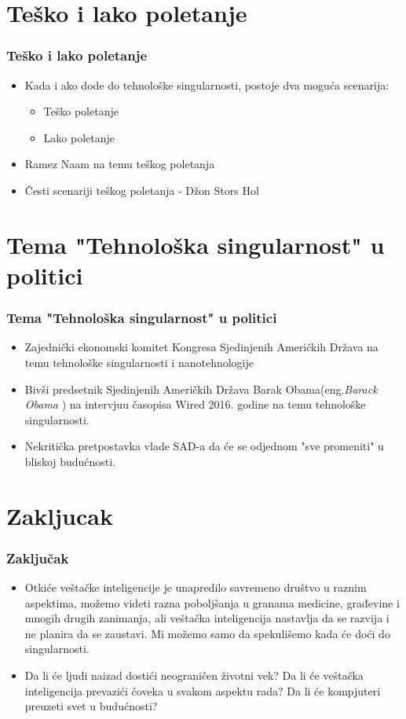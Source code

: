 \documentclass{beamer}
\begin{document}
\section{Teško i lako poletanje}

\begin{frame}[fragile]\frametitle{Teško i lako poletanje}
	\begin{itemize}	
		\item Kada i ako dode do tehnološke singularnosti, postoje dva moguća scenarija:
  \begin{itemize}
  \item Teško poletanje 
  \item  Lako poletanje
  \end{itemize}
		\item Ramez Naam na temu teškog poletanja
		\item Česti scenariji teškog poletanja - Džon Stors Hol
	\end{itemize}
\end{frame}

\section{Tema "Tehnološka singularnost" u politici}

\begin{frame}[fragile]\frametitle{Tema "Tehnološka singularnost" u politici}
	\begin{itemize}	
		\item Zajednički ekonomski komitet Kongresa Sjedinjenih Američkih Država na temu tehnološke singularnosti  i nanotehnologije
		\item Bivši predsetnik Sjedinjenih Američkih Država Barak Obama(eng.\textit{Barack Obama} ) na intervjuu časopisa Wired 2016. godine na temu tehnološke singularnosti.
		\item Nekritička pretpostavka vlade SAD-a da će se odjednom "sve promeniti" u bliskoj budućnosti.
	\end{itemize}
\end{frame}

\section{Zakljucak}

\begin{frame}[fragile]\frametitle{Zaključak}
\begin{itemize}	
 \item Otkiće veštačke inteligencije je unapredilo savremeno društvo  u raznim aspektima, možemo videti razna poboljšanja u granama medicine, građevine i mnogih drugih zanimanja, ali veštačka inteligencija nastavlja da se razvija i ne planira da se zaustavi. Mi možemo samo da spekulišemo kada će doći do singularnosti.
\item Da li će ljudi naizad dostići neograničen životni vek? Da li će veštačka inteligencija prevazići čoveka u svakom aspektu rada? Da li će kompjuteri preuzeti svet u budućnosti?

\end{itemize}
\end{frame}
\end{document}
